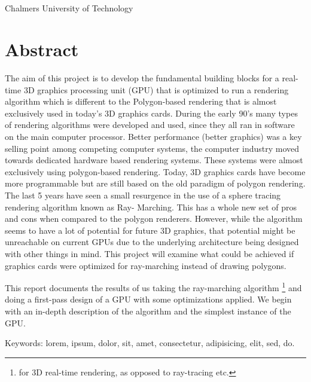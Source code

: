 \varHeadline\\
\varSubtitle\\
\varNames\\
\varDepartment\\
Chalmers University of Technology \setlength{\parskip}{0.5cm}

\thispagestyle{plain}			%
\setlength{\parskip}{0pt plus 1.0pt}
\section*{Abstract}
The aim of this project is to develop the fundamental building blocks for a real-
time 3D graphics processing unit (GPU) that is optimized to run a rendering 
algorithm which is different to the Polygon-based rendering that is almost 
exclusively used in today's 3D graphics cards. During the early 90’s many types of 
rendering algorithms were developed and used, since they all ran in software on the 
main computer processor. Better performance (better graphics) was a key selling 
point among competing computer systems, the computer industry moved towards 
dedicated hardware based rendering systems. These systems were almost exclusively 
using polygon-based rendering. Today, 3D graphics cards have become more 
programmable but are still based on the old paradigm of polygon rendering. The last 
5 years have seen a small resurgence in the use of a sphere tracing rendering 
algorithm known as Ray- Marching. This has a whole new set of pros and cons when 
compared to the polygon renderers.  However, while the algorithm seems to have a lot 
of potential for future 3D graphics, that potential might be unreachable on current 
GPUs due to the underlying architecture being designed with other things in mind. 
This project will examine what could be achieved if graphics cards were optimized 
for ray-marching instead of drawing polygons.  

This report documents the results of us taking the ray-marching algorithm
\footnote{for 3D real-time rendering, as opposed to ray-tracing etc.} and doing
a first-pass design of a GPU with some optimizations applied. We begin with an
in-depth description of the algorithm and the simplest instance of the GPU. 


\vfill
Keywords: lorem, ipsum, dolor, sit, amet, consectetur, adipisicing, elit, sed, do.

\newpage				%
\thispagestyle{empty}
\mbox{}
